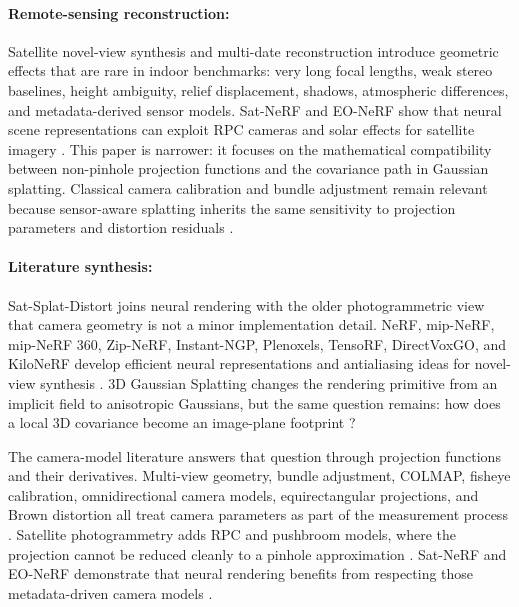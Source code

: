 \documentclass{article}
\begin{document}
\paragraph{Remote-sensing reconstruction:}
Satellite novel-view synthesis and multi-date reconstruction introduce geometric effects that are rare in indoor benchmarks: very long focal lengths, weak stereo baselines, height ambiguity, relief displacement, shadows, atmospheric differences, and metadata-derived sensor models. Sat-NeRF and EO-NeRF show that neural scene representations can exploit RPC cameras and solar effects for satellite imagery \citep{mar2022satnerf,mar2023eonerf}. This paper is narrower: it focuses on the mathematical compatibility between non-pinhole projection functions and the covariance path in Gaussian splatting. Classical camera calibration and bundle adjustment remain relevant because sensor-aware splatting inherits the same sensitivity to projection parameters and distortion residuals \citep{brown1971close,triggs2000bundle}.



\paragraph{Literature synthesis:}
Sat-Splat-Distort joins neural rendering with the older photogrammetric view that camera geometry is not a minor implementation detail. NeRF, mip-NeRF, mip-NeRF 360, Zip-NeRF, Instant-NGP, Plenoxels, TensoRF, DirectVoxGO, and KiloNeRF develop efficient neural representations and antialiasing ideas for novel-view synthesis \citep{mildenhall2020nerf,barron2021mipnerf,barron2022mipnerf360,barron2023zipnerf,muller2022instant,fridovichkeil2022plenoxels,chen2022tensorf,sun2022directvoxgo,reiser2021kilonerf}. 3D Gaussian Splatting changes the rendering primitive from an implicit field to anisotropic Gaussians, but the same question remains: how does a local 3D covariance become an image-plane footprint \citep{kerbl20233d,zwicker2002ewa}?

The camera-model literature answers that question through projection functions and their derivatives. Multi-view geometry, bundle adjustment, COLMAP, fisheye calibration, omnidirectional camera models, equirectangular projections, and Brown distortion all treat camera parameters as part of the measurement process \citep{hartley2004multiple,triggs2000bundle,schonberger2016sfm,schonberger2016mvs,kannala2006fisheye,scaramuzza2006omnidirectional,geyer2000catadioptric,mei2007singleviewpoint,brown1971close}. Satellite photogrammetry adds RPC and pushbroom models, where the projection cannot be reduced cleanly to a pinhole approximation \citep{tao2001rpc,grodecki2003block}. Sat-NeRF and EO-NeRF demonstrate that neural rendering benefits from respecting those metadata-driven camera models \citep{mar2022satnerf,mar2023eonerf}.
\end{document}
